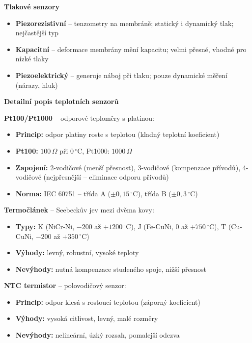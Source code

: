 \documentclass[a4paper,10pt]{article}
\begin{document}
\begin{vysvetlenibox}
\textbf{Tlakové senzory}
\begin{itemize}[noitemsep, leftmargin=1.4em, topsep=4pt]
    \item \textbf{Piezorezistivní} -- tenzometry na membráně;
          statický i dynamický tlak; nejčastější typ
    \item \textbf{Kapacitní} -- deformace membrány mění kapacitu;
          velmi přesné, vhodné pro nízké tlaky
    \item \textbf{Piezoelektrický} -- generuje náboj při tlaku;
          pouze dynamické měření (nárazy, hluk)
\end{itemize}

\textbf{Detailní popis teplotních senzorů}

\textbf{Pt100/Pt1000} -- odporové teploměry s platinou:
\begin{itemize}[noitemsep, leftmargin=1.4em, topsep=4pt]
    \item \textbf{Princip:} odpor platiny roste s teplotou (kladný teplotní koeficient)
    \item \textbf{Pt100:} $100\,\Omega$ při $0\,^\circ$C, Pt1000: $1000\,\Omega$
    \item \textbf{Zapojení:} 2-vodičové (menší přesnost), 3-vodičové (kompenzace přívodů),
          4-vodičové (nejpřesnější -- eliminace odporu přívodů)
    \item \textbf{Norma:} IEC 60751 -- třída A ($\pm0{,}15\,^\circ$C), třída B ($\pm0{,}3\,^\circ$C)
\end{itemize}

\textbf{Termočlánek} -- Seebeckův jev mezi dvěma kovy:
\begin{itemize}[noitemsep, leftmargin=1.4em, topsep=4pt]
    \item \textbf{Typy:} K (NiCr-Ni, $-200$ až $+1200\,^\circ$C),
          J (Fe-CuNi, $0$ až $+750\,^\circ$C),
          T (Cu-CuNi, $-200$ až $+350\,^\circ$C)
    \item \textbf{Výhody:} levný, robustní, vysoké teploty
    \item \textbf{Nevýhody:} nutná kompenzace studeného spoje, nižší přesnost
\end{itemize}

\textbf{NTC termistor} -- polovodičový senzor:
\begin{itemize}[noitemsep, leftmargin=1.4em, topsep=4pt]
    \item \textbf{Princip:} odpor klesá s rostoucí teplotou (záporný koeficient)
    \item \textbf{Výhody:} vysoká citlivost, levný, malé rozměry
    \item \textbf{Nevýhody:} nelineární, úzký rozsah, pomalejší odezva
\end{itemize}


\end{vysvetlenibox}
\end{document}
